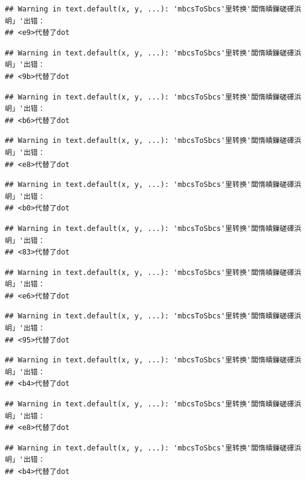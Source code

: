 \documentclass[
]{book}
\begin{document}
\begin{verbatim}
## Warning in text.default(x, y, ...): 'mbcsToSbcs'里转换'闆惰皟鏁磋礋浜岄」'出错：
## <e9>代替了dot
\end{verbatim}

\begin{verbatim}
## Warning in text.default(x, y, ...): 'mbcsToSbcs'里转换'闆惰皟鏁磋礋浜岄」'出错：
## <9b>代替了dot
\end{verbatim}

\begin{verbatim}
## Warning in text.default(x, y, ...): 'mbcsToSbcs'里转换'闆惰皟鏁磋礋浜岄」'出错：
## <b6>代替了dot
\end{verbatim}

\begin{verbatim}
## Warning in text.default(x, y, ...): 'mbcsToSbcs'里转换'闆惰皟鏁磋礋浜岄」'出错：
## <e8>代替了dot
\end{verbatim}

\begin{verbatim}
## Warning in text.default(x, y, ...): 'mbcsToSbcs'里转换'闆惰皟鏁磋礋浜岄」'出错：
## <b0>代替了dot
\end{verbatim}

\begin{verbatim}
## Warning in text.default(x, y, ...): 'mbcsToSbcs'里转换'闆惰皟鏁磋礋浜岄」'出错：
## <83>代替了dot
\end{verbatim}

\begin{verbatim}
## Warning in text.default(x, y, ...): 'mbcsToSbcs'里转换'闆惰皟鏁磋礋浜岄」'出错：
## <e6>代替了dot
\end{verbatim}

\begin{verbatim}
## Warning in text.default(x, y, ...): 'mbcsToSbcs'里转换'闆惰皟鏁磋礋浜岄」'出错：
## <95>代替了dot
\end{verbatim}

\begin{verbatim}
## Warning in text.default(x, y, ...): 'mbcsToSbcs'里转换'闆惰皟鏁磋礋浜岄」'出错：
## <b4>代替了dot
\end{verbatim}

\begin{verbatim}
## Warning in text.default(x, y, ...): 'mbcsToSbcs'里转换'闆惰皟鏁磋礋浜岄」'出错：
## <e8>代替了dot
\end{verbatim}

\begin{verbatim}
## Warning in text.default(x, y, ...): 'mbcsToSbcs'里转换'闆惰皟鏁磋礋浜岄」'出错：
## <b4>代替了dot
\end{verbatim}
\end{document}
